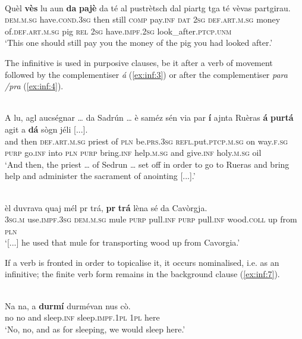 \ea\label{ex:inf:2}
\\
\gll    Quèl \textbf{vès} lu aun \textbf{da} \textbf{pajè} da té al pustrètsch dal piartg tga té vèvas partgirau.\\
\textsc{dem.m.sg} have.\textsc{cond.3sg} then still \textsc{comp} pay.\textsc{inf} \textsc{dat} \textsc{2sg} \textsc{def.art.m.sg} money of.\textsc{def.art.m.sg} pig \textsc{rel} \textsc{2sg} have.\textsc{impf.2sg} look\_after.\textsc{ptcp.unm}\\
\glt `This one should still pay you the money of the pig you had looked after.'
\z

The infinitive is used in purposive clauses, be it after a verb of movement followed by the complementiser \textit{á} (\ref{ex:inf:3}) or after the complementiser \textit{para /pra} (\ref{ex:inf:4}).

\ea\label{ex:inf:3}
\\
\gll    A lu, agl aucségnar … da Sadrún … è saméz sén via par \textbf{í} ajnta Ruèras \textbf{á} \textbf{purtá} agit a \textbf{dá} sògn jéli [...].\\
and then \textsc{def.art.m.sg} priest {} of \textsc{pln} {} be.\textsc{prs.3sg} \textsc{refl.}put.\textsc{ptcp.m.sg} on way.\textsc{f.sg} \textsc{purp} go.\textsc{inf} into \textsc{pln}  \textsc{purp} bring.\textsc{inf} help.\textsc{m.sg} and give.\textsc{inf} holy.\textsc{m.sg} oil\\
\glt `And then, the priest … of Sedrun … set off in order to go to Rueras and bring help and administer the sacrament of anointing [...].'
\z

\ea\label{ex:inf:4}
\\
\gll [...] èl duvrava quaj mél pr trá, \textbf{pr} \textbf{trá} lèna sé da Cavòrgja.\\
{} \textsc{3sg.m} use.\textsc{impf.3sg} \textsc{dem.m.sg} mule \textsc{purp} pull.\textsc{inf} \textsc{purp} pull.\textsc{inf} wood.\textsc{coll} up from \textsc{pln}  \\
\glt `[...] he used that mule for transporting wood up from Cavorgia.'
\z

If a verb is fronted in order to topicalise it, it occurs nominalised, i.e. as an infinitive; the finite verb form remains in the background clause (\ref{ex:inf:7}).

\ea\label{ex:inf:7}
\\
\gll Na na, a \textbf{durmí} durmévan nus cò. \\
no no and sleep.\textsc{inf} sleep.\textsc{impf.1pl} \textsc{1pl} here\\
\glt `No, no, and as for sleeping, we would sleep here.'
\z

